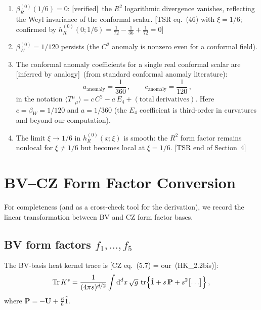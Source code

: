 \documentclass[12pt,a4paper]{article}
\theoremstyle{definition}
\theoremstyle{remark}
\newcommand{\Tr}{\operatorname{Tr}}
\newcommand{\tr}{\operatorname{tr}}
\newcommand{\dd}{\mathrm{d}}
\newcommand{\fromlit}[1]{\textcolor{blue!70!black}{\textsf{[#1]}}}
\newcommand{\verified}{\textcolor{green!50!black}{\textsf{[verified]}}}
\newcommand{\inferred}{\textcolor{orange!60!black}{\textsf{[inferred by analogy]}}}
\begin{document}
\begin{enumerate}
\item $\beta_R^{(0)}(1/6) = 0$:
\verified\ the $R^2$ logarithmic divergence vanishes, reflecting
the Weyl invariance of the conformal scalar.
\fromlit{TSR eq.~(46) with $\xi=1/6$; confirmed by
$h_R^{(0)}(0; 1/6) = \frac{1}{72} - \frac{1}{36} + \frac{1}{72} = 0$}

\item $\beta_W^{(0)} = 1/120$ persists (the $C^2$ anomaly is nonzero
even for a conformal field).

\item The conformal anomaly coefficients for a single real conformal
scalar are \inferred\ (from standard conformal anomaly literature):
\begin{equation}
  a_{\mathrm{anomaly}} = \frac{1}{360}\,,\qquad
  c_{\mathrm{anomaly}} = \frac{1}{120}\,,
  \label{eq:anomaly-coeffs-ac}
\end{equation}
in the notation $\langle T^\mu{}_\mu\rangle =
c\,C^2 - a\,E_4 + (\mathrm{total\ derivatives})$.
Here $c = \beta_W = 1/120$ and $a = 1/360$ (the $E_4$ coefficient
is third-order in curvatures and beyond our computation).

\item The limit $\xi \to 1/6$ in $h_R^{(0)}(x;\xi)$ is smooth:
the $R^2$ form factor remains nonlocal for $\xi \neq 1/6$ but
becomes local at $\xi = 1/6$.
\fromlit{TSR end of Section~4}
\end{enumerate}


\section{BV--CZ Form Factor Conversion}
\label{sec:BV-CZ}

For completeness (and as a cross-check tool for the derivation), we record
the linear transformation between BV and CZ form factor bases.

\subsection{BV form factors $f_1,\ldots,f_5$}

The BV-basis heat kernel trace is \fromlit{CZ eq.~(5.7) = our~(HK\_2.2bis)}:
\begin{equation}
  \Tr K^s = \frac{1}{(4\pi s)^{d/2}}\int \dd^d x\,\sqrt{g}\,\tr\Bigl\{
    \hat{1} + s\,\mathbf{P} + s^2\bigl[\ldots\bigr]
  \Bigr\}\,,
\end{equation}
where $\mathbf{P} = -\mathbf{U} + \frac{R}{6}\hat{1}$.
\end{document}
